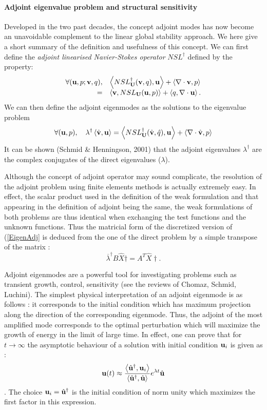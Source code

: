 \documentclass[twocolumn,10pt]{asme2ej}
\newcommand{\be}[1]{ \begin{equation} \label{#1}}
\newcommand{\ee}{\end{equation}}
\newcommand{\bes}[1]{ \begin{equation} \label{#1}\begin{array}{rl}}
\newcommand{\ees}{\end{array}\end{equation}}
\begin{document}
\paragraph{Adjoint eigenvalue problem and structural sensitivity}
Developed in the two past decades, the concept adjoint modes has now become an unavoidable complement to the linear global stability approach. We here give a short summary of the definition and usefulness of this concept.
We can first define the {\em adjoint linearised Navier-Stokes operator} $NSL^\dag$ defined by the property:
\bes{NSLAdj}
\forall ( {\bf u}, p ; {\bf v}, q), & \left< NSL^\dag_{\bf U}( {\bf v},q) ,{\bf u}\right> + \left< \nabla \cdot {\bf v},p\right>  \\
=& \left< {\bf v}, NSL_{\bf U} ({\bf u},p)\right> + \left< q, \nabla \cdot {\bf u}\right>.
\ees
We can then define the adjoint eigenmodes as the solutions to the eigenvalue problem 
\be{EigenAdj} 
\forall ( {\bf u}, p), \quad  \lambda^\dag \left< \hat{\bf v}, {\bf u}\right> =
 \left< NSL^\dag_{\bf U}( \hat{\bf v},\hat{q}) ,{\bf u}\right> + \left< \nabla \cdot \hat{\bf v},p\right>  
\ee
It can be shown (Schmid \& Henningson, 2001) that the adjoint eigenvalues $\lambda^\dag$ are the complex conjugates of the direct eigenvalues ($\lambda$). 

Although the concept of adjoint operator may sound complicate, the resolution of the adjoint problem using finite elements methods is actually extremely easy. In effect, the scalar product used in the definition of the weak formulation and that appearing in the definition of adjoint being the same, the weak formulations of both problems are thus identical when exchanging the test functions and the unknown functions. Thus the matricial form of the discretized version of (\ref{EigenAdj} is deduced from the one of the direct problem by a simple transpose of the matrix :
\be{Eigen_Adj_matricial}
\overline{\lambda}^\dag B \hat{X}\dag = A^T \hat{X}\dag.
\ee

Adjoint eigenmodes are a powerful tool for investigating problems such as transient growth, control, sensitivity (see the reviews of Chomaz, Schmid, Luchini). The simplest physical interpretation of an adjoint eigenmode is as follows : it corresponds to the initial condition which has maximum projection along the direction of the corresponding eigenmode.
Thus, the adjoint of the most amplified mode corresponds to the optimal perturbation which will maximize the growth of energy in the limit of large time. In effect, one can prove that for $t \rightarrow \infty$  the asymptotic behaviour of a solution with initial condition ${\bf u}_i$  is given as :
$$
{\bf u}(t) \approx 
\frac{ \left< \hat{\bf u}^\dag, {\bf u}_i\right>}{\left<\hat{\bf u}^\dag, \hat{\bf u}\right>} 
e^{\lambda t} \hat{\bf u}  
$$.
The choice ${\bf u}_i = \hat{\bf u}^\dag$ is the initial condition of norm unity which maximizes the first factor in this expression.
\end{document}
